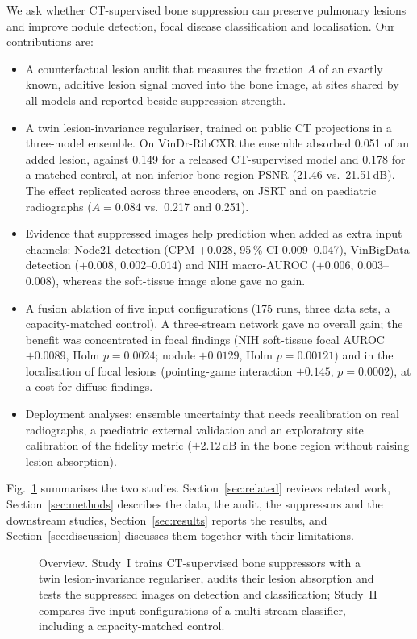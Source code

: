 We ask whether CT-supervised bone suppression can preserve pulmonary lesions and improve nodule detection, focal disease classification
and localisation. Our contributions are:
\begin{itemize}
\item A counterfactual lesion audit that measures the fraction $A$ of an exactly known, additive lesion signal moved into the bone image,
 at sites shared by all models and reported beside suppression strength.
\item A twin lesion-invariance regulariser, trained on public CT projections in a three-model ensemble. On VinDr-RibCXR the ensemble
 absorbed 0.051 of an added lesion, against 0.149 for a released CT-supervised model and 0.178 for a matched control, at non-inferior
 bone-region PSNR (21.46 vs.\ 21.51\,dB). The effect replicated across three encoders, on JSRT and on paediatric radiographs
 ($A=0.084$ vs.\ 0.217 and 0.251).
\item Evidence that suppressed images help prediction when added as extra input channels: Node21 detection (CPM $+0.028$,
 95\,\% CI 0.009--0.047), VinBigData detection ($+0.008$, 0.002--0.014) and NIH macro-AUROC ($+0.006$, 0.003--0.008), whereas the
 soft-tissue image alone gave no gain.
\item A fusion ablation of five input configurations (175 runs, three data sets, a capacity-matched control). A three-stream network gave
 no overall gain; the benefit was concentrated in focal findings (NIH soft-tissue focal AUROC $+0.0089$, Holm $p=0.0024$; nodule
 $+0.0129$, Holm $p=0.00121$) and in the localisation of focal lesions (pointing-game interaction $+0.145$, $p=0.0002$), at a cost for
 diffuse findings.
\item Deployment analyses: ensemble uncertainty that needs recalibration on real radiographs, a paediatric external validation and an
 exploratory site calibration of the fidelity metric ($+2.12$\,dB in the bone region without raising lesion absorption).
\end{itemize}
Fig.~\ref{fig:workflow} summarises the two studies. Section~\ref{sec:related} reviews related work, Section~\ref{sec:methods} describes
the data, the audit, the suppressors and the downstream studies, Section~\ref{sec:results} reports the results, and
Section~\ref{sec:discussion} discusses them together with their limitations.

\begin{figure}[!t]
\centering
{}
\caption{Overview. Study~I trains CT-supervised bone suppressors with a twin lesion-invariance regulariser, audits their lesion absorption
and tests the suppressed images on detection and classification; Study~II compares five input configurations of a multi-stream
classifier, including a capacity-matched control.}
\label{fig:workflow}
\end{figure}
